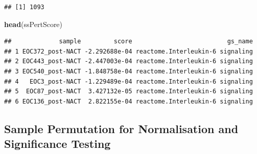 \documentclass[9pt,a4paper,]{extarticle}
\newenvironment{Shaded}{\begin{snugshade}}{\end{snugshade}}
\newcommand{\AttributeTok}[1]{\textcolor[rgb]{0.13,0.29,0.53}{#1}}
\newcommand{\DecValTok}[1]{\textcolor[rgb]{0.00,0.00,0.81}{#1}}
\newcommand{\FunctionTok}[1]{\textcolor[rgb]{0.13,0.29,0.53}{\textbf{#1}}}
\newcommand{\NormalTok}[1]{#1}
\newcommand{\OtherTok}[1]{\textcolor[rgb]{0.56,0.35,0.01}{#1}}
\newcommand{\SpecialCharTok}[1]{\textcolor[rgb]{0.81,0.36,0.00}{\textbf{#1}}}
\begin{document}
\begin{Shaded}
\end{Shaded}

\begin{verbatim}
## [1] 1093
\end{verbatim}

\begin{Shaded}
\begin{Highlighting}[]
\FunctionTok{head}\NormalTok{(ssPertScore)}
\end{Highlighting}
\end{Shaded}

\begin{verbatim}
##             sample         score                          gs_name
## 1 EOC372_post-NACT -2.292688e-04 reactome.Interleukin-6 signaling
## 2 EOC443_post-NACT -2.447003e-04 reactome.Interleukin-6 signaling
## 3 EOC540_post-NACT -1.848758e-04 reactome.Interleukin-6 signaling
## 4   EOC3_post-NACT -1.229489e-04 reactome.Interleukin-6 signaling
## 5  EOC87_post-NACT  3.427132e-05 reactome.Interleukin-6 signaling
## 6 EOC136_post-NACT  2.822155e-04 reactome.Interleukin-6 signaling
\end{verbatim}

\hypertarget{sample-permutation-for-normalisation-and-significance-testing}{%
\subsection{Sample Permutation for Normalisation and Significance Testing}\label{sample-permutation-for-normalisation-and-significance-testing}}
\end{document}
